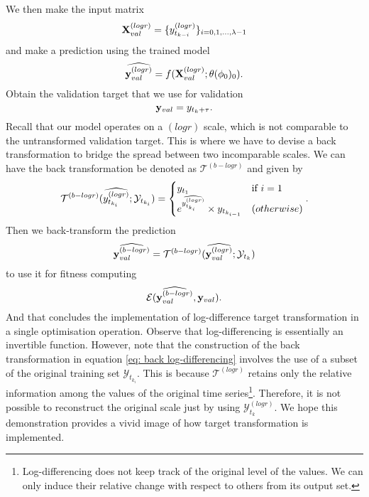 We then make the input matrix
\begin{equation*}
    \mathbf{X}^{(logr)}_{val} = \{y^{(logr)}_{t_{k-i}} \}_{i = 0, 1, \ldots, \lambda-1}
\end{equation*}
and make a prediction using the trained model
\begin{equation*}
    \widehat{\mathbf{y}^{(logr)}_{val}} = f(\mathbf{X}^{(logr)}_{val} ; \theta(\phi_0)_0).
\end{equation*}
Obtain the validation target that we use for validation
\begin{equation*}
    \mathbf{y}_{val} = y_{t_k + \tau}.
\end{equation*}
Recall that our model operates on a $(logr)$ scale, which is not comparable to the untransformed validation target. This is where we have to devise a back transformation to bridge the spread between two incomparable scales. We can have the back transformation be denoted as $\mathcal{T}^{(b-logr)}$ and given by
\begin{equation}\label{eq: back log-differencing}
    \mathcal{T}^{(b-logr)}(\widehat{y^{(logr)}_{t_{k_i}}} ;\mathcal{Y}_{t_{k_i}}) =
    \begin{cases}
        y_{t_1}                                                   &\text{if $i = 1$} \\
        e^{\widehat{y^{(logr)}_{t_{k_i}}}} \times y_{t_{k_{i-1}}} &\text(otherwise)
    \end{cases}.
\end{equation}
Then we back-transform the prediction
\begin{equation*}
    \widehat{\mathbf{y}^{(b-logr)}_{val}} = \mathcal{T}^{(b-logr)}(\widehat{\mathbf{y}^{(logr)}_{val}} ;\mathcal{Y}_{t_k})
\end{equation*}
to use it for fitness computing
\begin{equation*}
    \mathcal{E}(\widehat{\mathbf{y}^{(b-logr)}_{val}}, \mathbf{y}_{val}).
\end{equation*}
And that concludes the implementation of log-difference target transformation in a single optimisation operation. Observe that log-differencing is essentially an invertible function. However, note that the construction of the back transformation in equation \ref{eq: back log-differencing} involves the use of a subset of the original training set $\mathcal{Y}_{t_{k_i}}$. This is because $\mathcal{T}^{(logr)}$ retains only the relative information among the values of the original time series\footnote{Log-differencing does not keep track of the original level of the values. We can only induce their relative change with respect to others from its output set.}. Therefore, it is not possible to reconstruct the original scale just by using $\mathcal{Y}^{(logr)}_{t_k}$. We hope this demonstration provides a vivid image of how target transformation is implemented.

